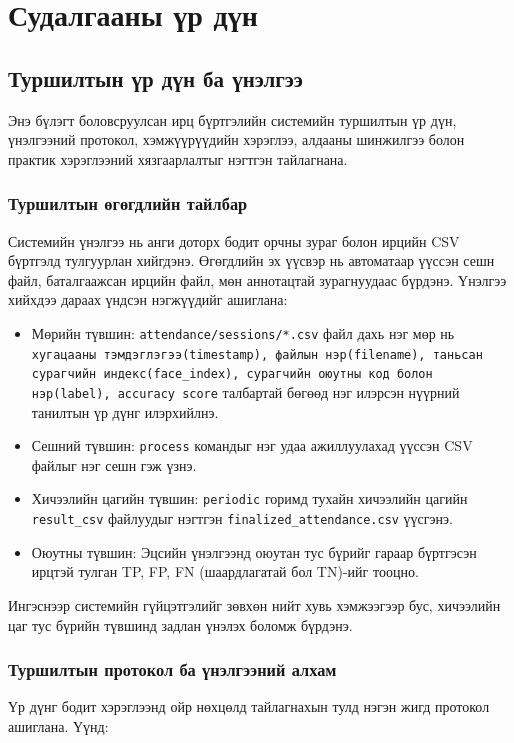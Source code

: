 \chapter{Судалгааны үр дүн}

\section{Туршилтын үр дүн ба үнэлгээ}

Энэ бүлэгт боловсруулсан ирц бүртгэлийн системийн туршилтын үр дүн, үнэлгээний протокол, хэмжүүрүүдийн хэрэглээ, алдааны шинжилгээ болон практик хэрэглээний хязгаарлалтыг нэгтгэн тайлагнана.

\subsection{Туршилтын өгөгдлийн тайлбар}
Системийн үнэлгээ нь анги доторх бодит орчны зураг болон ирцийн CSV бүртгэлд тулгуурлан хийгдэнэ. Өгөгдлийн эх үүсвэр нь автоматаар үүссэн сешн файл, баталгаажсан ирцийн файл, мөн аннотацтай зурагнуудаас бүрдэнэ. Үнэлгээ хийхдээ дараах үндсэн нэгжүүдийг ашиглана:

\begin{itemize}
	\item Мөрийн түвшин: \texttt{attendance/sessions/*.csv} файл дахь нэг мөр нь \texttt{хугацааны тэмдэглэгээ(timestamp), файлын нэр(filename), таньсан сурагчийн индекс(face\_index), сурагчийн оюутны код болон нэр(label), accuracy score} талбартай бөгөөд нэг илэрсэн нүүрний танилтын үр дүнг илэрхийлнэ.
	\item Сешний түвшин: \texttt{process} командыг нэг удаа ажиллуулахад үүссэн CSV файлыг нэг сешн гэж үзнэ.
	\item Хичээлийн цагийн түвшин: \texttt{periodic} горимд тухайн хичээлийн цагийн \texttt{result\_csv} файлуудыг нэгтгэн \texttt{finalized\_attendance.csv} үүсгэнэ.
	\item Оюутны түвшин: Эцсийн үнэлгээнд оюутан тус бүрийг гараар бүртгэсэн ирцтэй тулган TP, FP, FN (шаардлагатай бол TN)-ийг тооцно.
\end{itemize}

Ингэснээр системийн гүйцэтгэлийг зөвхөн нийт хувь хэмжээгээр бус, хичээлийн цаг тус бүрийн түвшинд задлан үнэлэх боломж бүрдэнэ.

\subsection{Туршилтын протокол ба үнэлгээний алхам}
Үр дүнг бодит хэрэглээнд ойр нөхцөлд тайлагнахын тулд нэгэн жигд протокол ашиглана. Үүнд:

